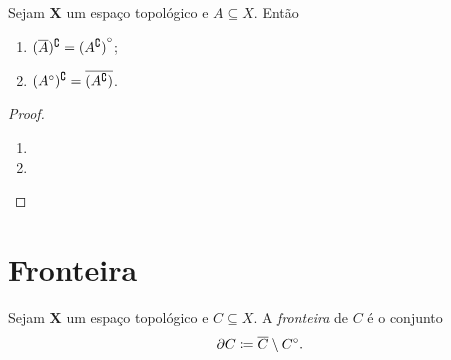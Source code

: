 \begin{prop}
	Sejam $\bm X$ um espaço topológico e $A \subseteq X$. Então
	\begin{enumerate}
	\item $(\overline{A})^\complement = {(A^\complement)}^\circ$;
	\item $({A}^\circ)^\complement = \overline{(A^\complement)}$.
	\end{enumerate}
\end{prop}
\begin{proof}
	\begin{enumerate}
	\item
	\item
	\end{enumerate}
\end{proof}


\section{Fronteira}

\begin{defi}
	Sejam $\bm X$ um espaço topológico e $C \subseteq X$. A \emph{fronteira} de $C$ é o conjunto
	\begin{equation*}
	\fro{C} \coloneqq \fec{C} \setminus \inn{C}.
	\end{equation*}
\end{defi}

